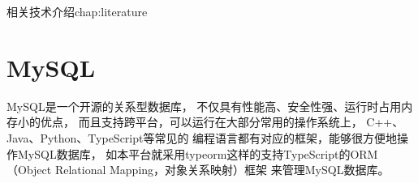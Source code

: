 \begin{cuzchapter}{相关技术介绍}{chap:literature}
	\section{MySQL}\label{sec:MySQL}


	MySQL是一个开源的关系型数据库，
	不仅具有性能高、安全性强、运行时占用内存小的优点\cite{XXDL202314058}，
	而且支持跨平台，可以运行在大部分常用的操作系统上，
	C++、Java、Python、TypeScript等常见的
	编程语言都有对应的框架，能够很方便地操作MySQL数据库，
	如本平台就采用typeorm这样的支持TypeScript的ORM（Object Relational Mapping，对象关系映射）框架
	来管理MySQL数据库。




	







\end{cuzchapter}
